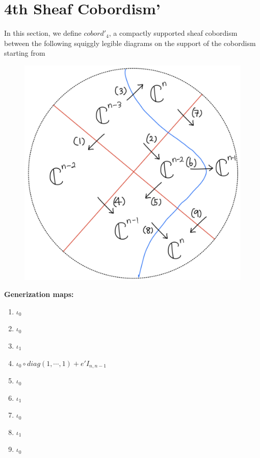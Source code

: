 \section{4th Sheaf Cobordism'}
In this section, we define $cobord'_4$, a compactly supported sheaf cobordism between the following squiggly legible diagrams on the support of the cobordism starting from
\begin{figure}[H]
    \centering
    \includegraphics[scale = 0.95]{diagrams/cobord'4/21.png}
    \caption{}
    \label{fig:your-label}
\end{figure}
\textbf{Generization maps:}
\begin{enumerate}[label = (\arabic*)]
\item $\iota_0$

\item $\iota_0$

\item $\iota_1$

\item $\iota_0 \circ diag(1,\cdots,1)+e'I_{n,n-1}$

\item $\iota_0$

\item $\iota_1$

\item $\iota_0$

\item $\iota_1$

\item $\iota_0$
\end{enumerate}


